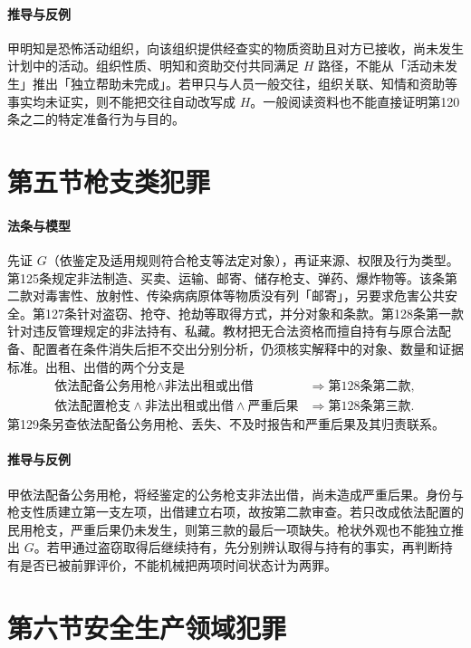 \paragraph{推导与反例}
甲明知是恐怖活动组织，向该组织提供经查实的物质资助且对方已接收，尚未发生计划中的活动。组织性质、明知和资助交付共同满足 $H$ 路径，不能从「活动未发生」推出「独立帮助未完成」。若甲只与人员一般交往，组织关联、知情和资助等事实均未证实，则不能把交往自动改写成 $H$。一般阅读资料也不能直接证明第120条之二的特定准备行为与目的。

\section{第五节\quad 枪支类犯罪}

\paragraph{法条与模型}
先证 $G$（依鉴定及适用规则符合枪支等法定对象），再证来源、权限及行为类型。第125条规定非法制造、买卖、运输、邮寄、储存枪支、弹药、爆炸物等。该条第二款对毒害性、放射性、传染病病原体等物质没有列「邮寄」，另要求危害公共安全。第127条针对盗窃、抢夺、抢劫等取得方式，并分对象和条款。第128条第一款针对违反管理规定的非法持有、私藏。教材把无合法资格而擅自持有与原合法配备、配置者在条件消失后拒不交出分别分析，仍须核实解释中的对象、数量和证据标准。出租、出借的两个分支是
\[
\begin{aligned}
 \text{依法配备公务用枪}\land\text{非法出租或出借}
   &\Longrightarrow \text{第128条第二款},\\
 \text{依法配置枪支}\land\text{非法出租或出借}\land\text{严重后果}
   &\Longrightarrow \text{第128条第三款}.
\end{aligned}
\]
第129条另查依法配备公务用枪、丢失、不及时报告和严重后果及其归责联系。

\paragraph{推导与反例}
甲依法配备公务用枪，将经鉴定的公务枪支非法出借，尚未造成严重后果。身份与枪支性质建立第一支左项，出借建立右项，故按第二款审查。若只改成依法配置的民用枪支，严重后果仍未发生，则第三款的最后一项缺失。枪状外观也不能独立推出 $G$。若甲通过盗窃取得后继续持有，先分别辨认取得与持有的事实，再判断持有是否已被前罪评价，不能机械把两项时间状态计为两罪。

\section{第六节\quad 安全生产领域犯罪}


